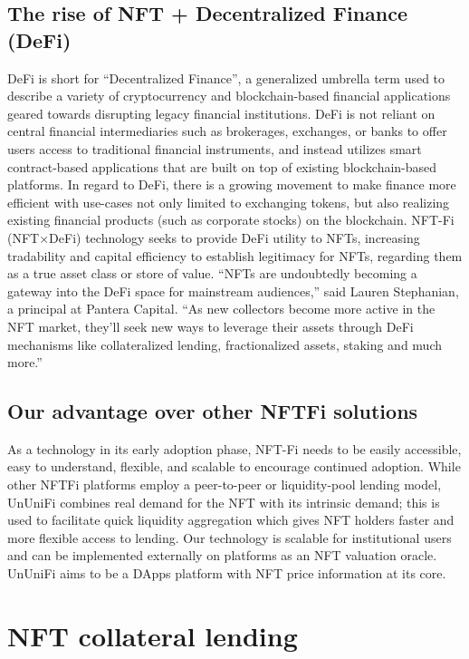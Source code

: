 \documentclass[dvipdfmx]{jsarticle}
\begin{document}
\subsection{The rise of NFT + Decentralized Finance (DeFi)}
DeFi is short for “Decentralized Finance”, a generalized umbrella term used to describe a variety of cryptocurrency and blockchain-based financial applications geared towards disrupting legacy financial institutions. DeFi is not reliant on central financial intermediaries such as brokerages, exchanges, or banks to offer users access to traditional financial instruments, and instead utilizes smart contract-based applications that are built on top of existing blockchain-based platforms. In regard to DeFi, there is a growing movement to make finance more efficient with use-cases not only limited to exchanging tokens, but also realizing existing financial products (such as corporate stocks) on the blockchain.
NFT-Fi (NFT×DeFi) technology seeks to provide DeFi utility to NFTs, increasing tradability and capital efficiency to establish legitimacy for NFTs, regarding them as a true asset class or store of value. “NFTs are undoubtedly becoming a gateway into the DeFi space for mainstream audiences,” said Lauren Stephanian, a principal at Pantera Capital. “As new collectors become more active in the NFT market, they’ll seek new ways to leverage their assets through DeFi mechanisms like collateralized lending, fractionalized assets, staking and much more.”

\subsection{Our advantage over other NFTFi solutions}
As a technology in its early adoption phase, NFT-Fi needs to be easily accessible, easy to understand, flexible, and scalable to encourage continued adoption. While other NFTFi platforms employ a peer-to-peer or liquidity-pool lending model, UnUniFi combines real demand for the NFT with its intrinsic demand; this is used to facilitate quick liquidity aggregation which gives NFT holders faster and more flexible access to lending. Our technology is scalable for institutional users and can be implemented externally on platforms as an NFT valuation oracle. UnUniFi aims to be a DApps platform with NFT price information at its core.


\section{NFT collateral lending}
\end{document}
